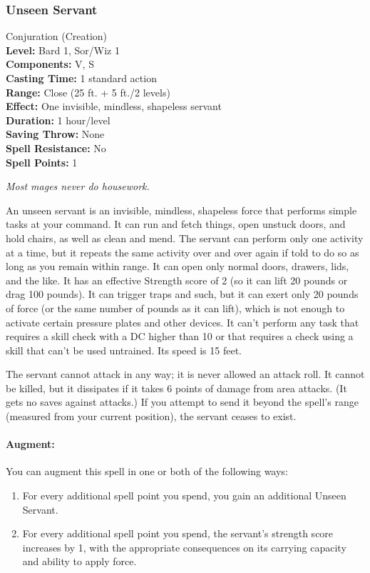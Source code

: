 \subsubsection{Unseen Servant}
\label{Spell:UnseenServant}
Conjuration (Creation)
\\ \textbf{Level:} Bard 1, Sor/Wiz 1
\\ \textbf{Components:} V, S
\\ \textbf{Casting Time:} 1 standard action
\\ \textbf{Range:} Close (25 ft. + 5 ft./2 levels)
\\ \textbf{Effect:} One invisible, mindless, shapeless servant
\\ \textbf{Duration:} 1 hour/level
\\ \textbf{Saving Throw:} None
\\ \textbf{Spell Resistance:} No
\\ \textbf{Spell Points:} 1

\emph{Most mages never do housework.}

An unseen servant is an invisible, mindless, shapeless force that performs simple tasks at your command. 
It can run and fetch things, open unstuck doors, and hold chairs, as well as clean and mend. 
The servant can perform only one activity at a time, but it repeats the same activity over and over again if told to do so as long as you remain within range. 
It can open only normal doors, drawers, lids, and the like. 
It has an effective Strength score of 2 (so it can lift 20 pounds or drag 100 pounds). 
It can trigger traps and such, but it can exert only 20 pounds of force (or the same number of pounds as it can lift), 
which is not enough to activate certain pressure plates and other devices. 
It can't perform any task that requires a skill check with a DC higher than 10 or that requires a check using a skill that can't be used untrained. 
Its speed is 15 feet.

The servant cannot attack in any way; it is never allowed an attack roll. 
It cannot be killed, but it dissipates if it takes 6 points of damage from area attacks. (It gets no saves against attacks.) 
If you attempt to send it beyond the spell's range (measured from your current position), the servant ceases to exist.

\paragraph{Augment:} You can augment this spell in one or both of the following ways:
\begin{enumerate}
 \item For every additional spell point you spend, you gain an additional Unseen Servant.
 \item For every additional spell point you spend, the servant's strength score increases by 1, with the appropriate consequences on its carrying capacity and
 ability to apply force.
\end{enumerate}
